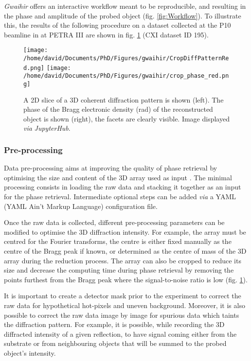 \textit{Gwaihir} offers an interactive workflow meant to be reproducible, and resulting in the phase and amplitude of the probed object (fig. \ref{fig:Workflow}).
To illustrate this, the results of the following procedure on a dataset collected at the P10 beamline in at PETRA III are shown in fig. \ref{fig:GUI_file} (CXI dataset ID 195).

\begin{figure}[!htb]
    \centering
    \texttt{[image: /home/david/Documents/PhD/Figures/gwaihir/CropDiffPatternRed.png]}
    \texttt{[image: /home/david/Documents/PhD/Figures/gwaihir/crop\_phase\_red.png]}
    \caption{
    A 2D slice of a 3D coherent diffraction pattern is shown (left).
    The phase of the Bragg electronic density (\unit{\radian}) of the reconstructed object is shown (right), the facets are clearly visible.
    Image displayed \textit{via} \textit{JupyterHub}.
    }
    \label{fig:GUI_file}
\end{figure}

\subsubsection{Pre-processing} \label{sec:preprocess}

Data pre-processing aims at improving the quality of phase retrieval by optimising the size and content of the 3D array used as input \parencite{Ozturk2017}.
The minimal processing consists in loading the raw data and stacking it together as an input for the phase retrieval.
Intermediate optional steps can be added \textit{via} a YAML (YAML Ain't Markup Language) configuration file.

Once the raw data is collected, different pre-processing parameters can be modified to optimise the 3D diffraction intensity.
For example, the array must be centred for the Fourier transforms, the centre is either fixed manually as the centre of the Bragg peak if known, or determined as the centre of mass of the 3D array during the reduction process.
The array can also be cropped to reduce its size and decrease the computing time during phase retrieval by removing the points furthest from the Bragg peak where the signal-to-noise ratio is low (fig. \ref{fig:GUI_file}).

It is important to create a detector mask prior to the experiment to correct the raw data for hypothetical hot-pixels and uneven background.
Moreover, it is also possible to correct the raw data image by image for spurious data which taints the diffraction pattern.
For example, it is possible, while recording the 3D diffracted intensity of a given reflection, to have signal coming either from the substrate or from neighbouring objects that will be summed to the probed object's intensity.

